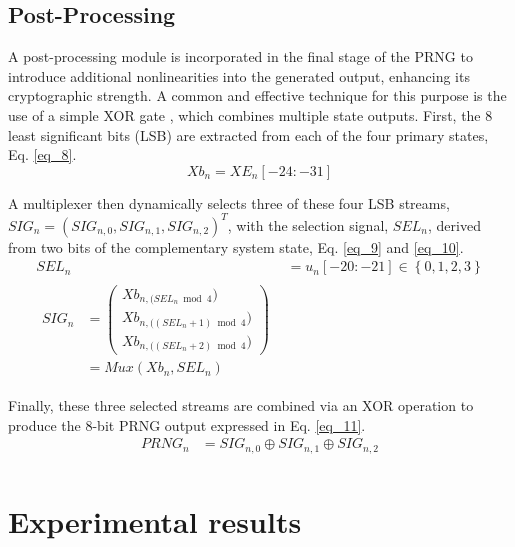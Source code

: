 \documentclass[preprint,12pt]{elsarticle}
\begin{document}
\subsection{Post-Processing}

A post-processing module is incorporated in the final stage of the PRNG to introduce additional nonlinearities into the generated output, enhancing its cryptographic strength. A common and effective technique for this purpose is the use of a simple XOR gate \cite{benkouider_novel_2024, dridi_design_2023, dridi_design_2022}, which combines multiple state outputs. First, the 8 least significant bits (LSB) are extracted from each of the four primary states, Eq. \ref{eq_8}.
\begin{equation}
Xb_{n} = XE_n\left[-24:-31 \right]
\label{eq_8}
\end{equation}

A multiplexer then dynamically selects three of these four LSB streams, $SIG_n = (SIG_{n,0}, SIG_{n,1}, SIG_{n,2})^T$, with the selection signal, $SEL_n$, derived from two bits of the complementary system state, Eq. \ref{eq_9} and \ref{eq_10}.
\begin{align}
\label{eq_9}
SEL_n &= u_n\left[-20:-21 \right] \in \left\{0,1,2,3\right\} \\
\label{eq_10}
\begin{split}
SIG_n &=
  \left(\begin{array}{l}
    Xb_{n, (SEL_n \bmod 4}) \\
    Xb_{n, ((SEL_n+1) \bmod 4}) \\
    Xb_{n, ((SEL_n+2) \bmod 4})  
  \end{array}\right)\\
&=Mux(Xb_n,SEL_n)
\end{split}
\end{align}

Finally, these three selected streams are combined via an XOR operation to produce the 8-bit PRNG output expressed in Eq. \ref{eq_11}.
\begin{equation}
\begin{aligned}
    PRNG_n &= SIG_{n,0} \oplus SIG_{n,1} \oplus SIG_{n,2} \\
\end{aligned}
\label{eq_11}
\end{equation}

\section{Experimental results}\label{sec_4}
\end{document}
